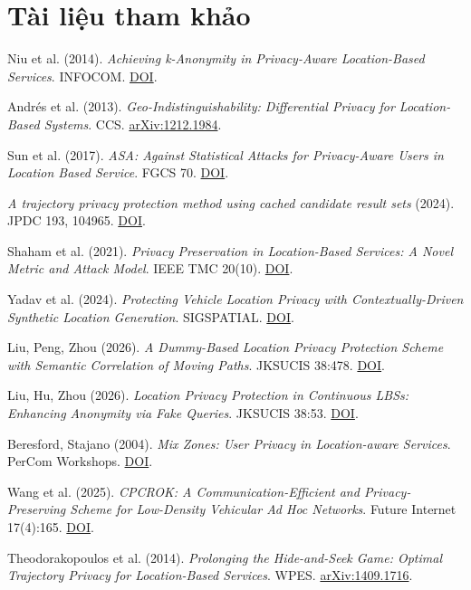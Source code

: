 \documentclass[10pt,a4paper]{article}
\begin{document}
\section*{Tài liệu tham khảo}
\small\RaggedRight
\begin{enumerate}[label={[\arabic*]},leftmargin=2em,itemsep=6pt]
\item Niu et al. (2014). \emph{Achieving k-Anonymity in Privacy-Aware Location-Based Services}. INFOCOM. \href{https://doi.org/10.1109/INFOCOM.2014.6848002}{DOI}.
\item Andrés et al. (2013). \emph{Geo-Indistinguishability: Differential Privacy for Location-Based Systems}. CCS. \href{https://arxiv.org/abs/1212.1984}{arXiv:1212.1984}.
\item Sun et al. (2017). \emph{ASA: Against Statistical Attacks for Privacy-Aware Users in Location Based Service}. FGCS 70. \href{https://doi.org/10.1016/j.future.2016.06.017}{DOI}.
\item \emph{A trajectory privacy protection method using cached candidate result sets} (2024). JPDC 193, 104965. \href{https://doi.org/10.1016/j.jpdc.2024.104965}{DOI}.
\item Shaham et al. (2021). \emph{Privacy Preservation in Location-Based Services: A Novel Metric and Attack Model}. IEEE TMC 20(10). \href{https://doi.org/10.1109/TMC.2020.2993599}{DOI}.
\item Yadav et al. (2024). \emph{Protecting Vehicle Location Privacy with Contextually-Driven Synthetic Location Generation}. SIGSPATIAL. \href{https://doi.org/10.1145/3678717.3691211}{DOI}.
\item Liu, Peng, Zhou (2026). \emph{A Dummy-Based Location Privacy Protection Scheme with Semantic Correlation of Moving Paths}. JKSUCIS 38:478. \href{https://doi.org/10.1007/s44443-026-00899-w}{DOI}.
\item Liu, Hu, Zhou (2026). \emph{Location Privacy Protection in Continuous LBSs: Enhancing Anonymity via Fake Queries}. JKSUCIS 38:53. \href{https://doi.org/10.1007/s44443-025-00438-z}{DOI}.
\item Beresford, Stajano (2004). \emph{Mix Zones: User Privacy in Location-aware Services}. PerCom Workshops. \href{https://doi.org/10.1109/PERCOMW.2004.1276918}{DOI}.
\item Wang et al. (2025). \emph{CPCROK: A Communication-Efficient and Privacy-Preserving Scheme for Low-Density Vehicular Ad Hoc Networks}. Future Internet 17(4):165. \href{https://doi.org/10.3390/fi17040165}{DOI}.
\item Theodorakopoulos et al. (2014). \emph{Prolonging the Hide-and-Seek Game: Optimal Trajectory Privacy for Location-Based Services}. WPES. \href{https://arxiv.org/abs/1409.1716}{arXiv:1409.1716}.

\end{enumerate}
\end{document}
